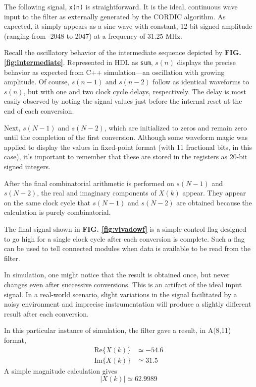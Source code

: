 \documentclass[reprint,amsmath,amssymb,aps,pra]{revtex4-2}
\begin{document}
 The following signal, \verb|x(n)| is straightforward. It is the ideal, continuous wave input to the filter as externally generated by the CORDIC algorithm. As expected, it simply appears as a sine wave with constant, 12-bit signed amplitude (ranging from -2048 to 2047) at a frequency of 31.25 MHz.

 Recall the oscillatory behavior of the intermediate sequence depicted by \textbf{FIG. \ref{fig:intermediate}}. Represented in HDL as \verb|sum|, $s(n)$ displays the precise behavior as expected from C++ simulation---an oscillation with growing amplitude. Of course, $s(n-1)$ and $s(n-2)$ follow as identical waveforms to $s(n)$, but with one and two clock cycle delays, respectively. The delay is most easily observed by noting the signal values just before the internal reset at the end of each conversion.

 Next, $s(N-1)$ and $s(N-2)$, which are initialized to zeros and remain zero until the completion of the first conversion. Although some waveform magic was applied to display the values in fixed-point format (with 11 fractional bits, in this case), it's important to remember that these are stored in the registers as 20-bit signed integers.

 After the final combinatorial arithmetic is performed on $s(N-1)$ and $s(N-2)$, the real and imaginary components of $X(k)$ appear. They appear on the same clock cycle that $s(N-1)$ and $s(N-2)$ are obtained because the calculation is purely combinatorial.

 The final signal shown in \textbf{FIG. \ref{fig:vivadowf}} is a simple control flag designed to go high for a single clock cycle after each conversion is complete. Such a flag can be used to tell connected modules when data is available to be read from the filter.

 In simulation, one might notice that the result is obtained once, but never changes even after successive conversions. This is an artifact of the ideal input signal. In a real-world scenario, slight variations in the signal facilitated by a noisy environment and imprecise instrumentation will produce a slightly different result after each conversion.

 In this particular instance of simulation, the filter gave a result, in A(8,11) format,
 \begin{align}
     \text{Re}\{X(k)\} & \simeq -54.6 \nonumber \\
     \text{Im}\{X(k)\} & \simeq 31.5 \nonumber
 \end{align}
 A simple magnitude calculation gives 
 \begin{equation}
     |X(k)| \simeq 62.9989
 \end{equation}
\end{document}
